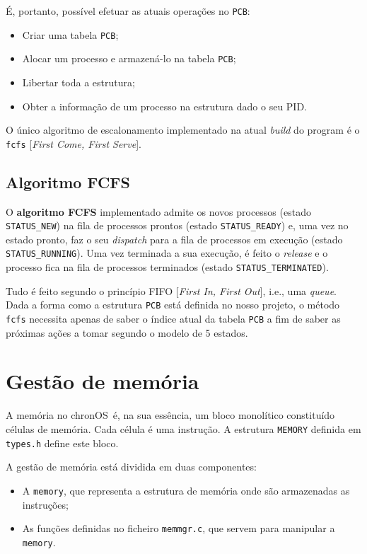 \documentclass[a4paper,11pt,onecolumn,oneside]{article}
\newcommand{\chronOS}{\textsf{chronOS}}
\begin{document}
	É, portanto, possível efetuar as atuais operações no \verb|PCB|:
	\begin{itemize}
	    \item Criar uma tabela \verb|PCB|;
	    \item Alocar um processo e armazená-lo na tabela \verb|PCB|;
	    \item Libertar toda a estrutura;
	    \item Obter a informação de um processo na estrutura dado o seu PID.
	\end{itemize}
	
	O único algoritmo de escalonamento implementado na atual \textit{build} do program é o \verb|fcfs| [\textit{First Come, First Serve}].
	
	
	\subsection{Algoritmo FCFS}
	\label{ssec:process:fcfs}
	
	O \textbf{algoritmo FCFS} implementado admite os novos processos (estado \texttt{STATUS\_NEW}) na fila de processos prontos (estado \texttt{STATUS\_READY}) e, uma vez no estado pronto, faz o seu \textit{dispatch} para a fila de processos em execução (estado \texttt{STATUS\_RUNNING}). Uma vez terminada a sua execução, é feito o \textit{release} e o processo fica na fila de processos terminados (estado \texttt{STATUS\_TERMINATED}).
	
	Tudo é feito segundo o princípio FIFO [\textit{First In, First Out}], i.e., uma \textit{queue}. Dada a forma como a estrutura \verb|PCB| está definida no nosso projeto, o método \verb|fcfs| necessita apenas de saber o índice atual da tabela \verb|PCB| a fim de saber as próximas ações a tomar segundo o modelo de 5 estados.
	
	
	\section{Gestão de memória}
	\label{sec:memory}
	
	A memória no \chronOS~é, na sua essência, um bloco monolítico constituído células de memória. Cada célula é uma instrução. A estrutura \verb|MEMORY| definida em \texttt{types.h} define este bloco.
	
	A gestão de memória está dividida em duas componentes:
	\begin{itemize}
		\item A \verb|memory|, que representa a estrutura de memória onde são armazenadas as instruções;
		\item As funções definidas no ficheiro \verb|memmgr.c|, que servem para manipular a \verb|memory|.
	\end{itemize}
	
\end{document}
